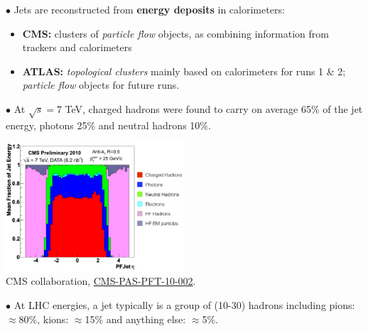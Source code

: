\documentclass[9pt,a4paper,unknownkeysallowed,xcolor=dvipsnames,aspectratio=43]{beamer}
\begin{document}
\begin{frame}\vspace{2mm}

{\color{darkred}\Large$\bullet$} Jets are reconstructed from {\bf energy deposits} in calorimeters:\\
\vspace{1mm}
\begin{itemize}
    \item[\diamondsuit] {\bf CMS:} clusters of {\it particle flow} objects, as combining information from trackers and calorimeters
    \item[\diamondsuit] {\bf ATLAS:} {\it topological clusters} mainly based on calorimeters for runs 1 \& 2; {\it particle flow} objects for future runs.
\end{itemize}
\vspace{1mm}

{\color{darkred}\Large$\bullet$} At $\sqrt{s}=7$ TeV, charged
hadrons were found to carry on average 65\% of the jet energy, photons 25\% and neutral hadrons
10\%. 
\begin{center}
\includegraphics[width=0.5\textwidth]{01/jetchem.png}\\
{\tiny\color{teablue}
{\scshape CMS} collaboration, %
\href{https://inspirehep.net/files/01f35fa9e56c5e0c30f1b9b4c0560656}{CMS-PAS-PFT-10-002}.}
\end{center}

{\color{darkred}\Large$\bullet$} At LHC energies, a jet typically is a group of (10-30) hadrons including pions: $\approx$80\%, kions: $\approx$15\% and anything else: $\approx$5\%. 
\end{frame}
%
%
%
\end{document}
